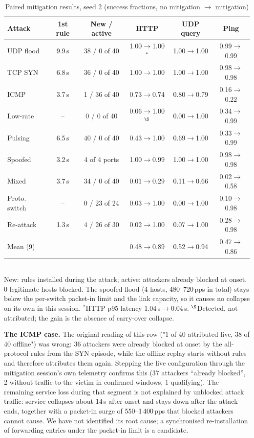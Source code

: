\documentclass[conference]{IEEEtran}
\begin{document}
\begin{table}[t]
\caption{Paired mitigation results, seed 2 (success fractions, no mitigation $\to$ mitigation)}
\label{tab:mitig}
\centering
\setlength{\tabcolsep}{2.0pt}
\begin{tabular}{lccccc}
\toprule
Attack & 1st rule & New / active & HTTP & UDP query & Ping \\
\midrule
UDP flood & 9.9\,s & 38 / 0 of 40 & 1.00$\to$1.00$^*$ & 1.00$\to$1.00 & 0.99$\to$0.99 \\
TCP SYN & 6.8\,s & 36 / 0 of 40 & 1.00$\to$1.00 & 1.00$\to$1.00 & 0.98$\to$0.98 \\
ICMP & 3.7\,s & 1 / 36 of 40 & 0.73$\to$0.74 & 0.80$\to$0.79 & 0.16$\to$0.22 \\
Low-rate & -- & 0 / 0 of 40 & 0.06$\to$1.00$^\S$ & 0.00$\to$1.00 & 0.34$\to$0.99 \\
Pulsing & 6.5\,s & 40 / 0 of 40 & 0.43$\to$1.00 & 0.69$\to$1.00 & 0.33$\to$0.99 \\
Spoofed & 3.2\,s & 4 of 4 ports & 1.00$\to$0.99 & 1.00$\to$1.00 & 0.98$\to$0.98 \\
Mixed & 3.7\,s & 34 / 0 of 40 & 0.01$\to$0.29 & 0.11$\to$0.66 & 0.02$\to$0.58 \\
Proto. switch & -- & 0 / 23 of 24 & 0.03$\to$1.00 & 0.00$\to$1.00 & 0.10$\to$0.98 \\
Re-attack & 1.3\,s & 4 / 26 of 30 & 0.02$\to$1.00 & 0.07$\to$1.00 & 0.28$\to$0.98 \\
\midrule
Mean (9) & & & 0.48$\to$0.89 & 0.52$\to$0.94 & 0.47$\to$0.86 \\
\bottomrule
\end{tabular}\\[2pt]
\footnotesize New: rules installed during the attack; active: attackers already blocked at onset. 0 legitimate hosts blocked. The spoofed flood (4 hosts, 480--720\,pps in total) stays below the per-switch packet-in limit and the link capacity, so it causes no collapse on its own in this session. $^*$HTTP p95 latency 1.04\,s$\to$0.04\,s. $^\S$Detected, not attributed; the gain is the absence of carry-over collapse.
\end{table}

\textbf{The ICMP case.} The original reading of this row ("1 of 40 attributed live, 38 of 40 offline") was wrong: 36 attackers were already blocked at onset by the all-protocol rules from the SYN episode, while the offline replay starts without rules and therefore attributes them again. Stepping the live configuration through the mitigation session's own telemetry confirms this (37 attackers ``already blocked'', 2 without traffic to the victim in confirmed windows, 1 qualifying). The remaining service loss during that segment is not explained by unblocked attack traffic: service collapses about 14\,s after onset and stays down after the attack ends, together with a packet-in surge of 550--1\,400\,pps that blocked attackers cannot cause. We have not identified its root cause; a synchronised re-installation of forwarding entries under the packet-in limit is a candidate.
\end{document}
